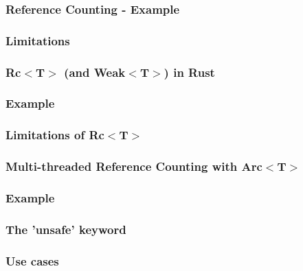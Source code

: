 \documentclass{beamer}
\begin{document}
	\begin{frame}
		\frametitle{Reference Counting - Example}
		\begin{figure}
			\def\svgwidth{230pt}
			\huge
			
		\end{figure}
	\end{frame}
	\begin{frame}
		\frametitle{Limitations}
	\end{frame}
	\begin{frame}
		\frametitle{Rc$<$T$>$ (and Weak$<$T$>$) in Rust}
	\end{frame}
	\begin{frame}
		\frametitle{Example}
	\end{frame}
	\begin{frame}
		\frametitle{Limitations of Rc$<$T$>$}
	\end{frame}
	\begin{frame}
		\frametitle{Multi-threaded Reference Counting with Arc$<$T$>$}
	\end{frame}
	\begin{frame}
		\frametitle{Example}
	\end{frame}
	\begin{frame}
		\frametitle{The 'unsafe' keyword}
	\end{frame}
	\begin{frame}
		\frametitle{Use cases}
	\end{frame}
\end{document}
